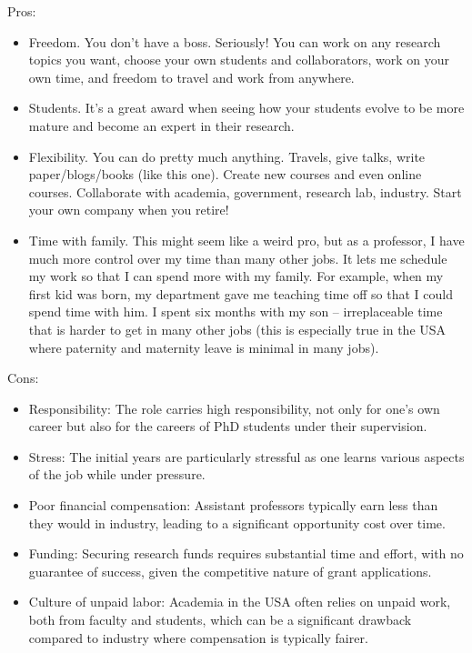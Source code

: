\documentclass[oneside,11pt,dvipsnames]{book}
\begin{document}
Pros:
\begin{itemize}
\item Freedom. You don’t have a boss. Seriously! You can work on any research topics you want, choose your own students and collaborators, work on your own time, and freedom to travel and work from anywhere.

  \item Students. It's a great award when seeing how your students evolve to be more mature and become an expert in their research.

\item Flexibility. You can do pretty much anything.  Travels, give talks, write paper/blogs/books (like this one).  Create new courses and even online courses.  Collaborate  with academia, government, research lab, industry.  Start your own company when you retire!

\item Time with family. This might seem like a weird pro, but as a professor, I have much more
control over my time than many other jobs. It lets me schedule my work so that I can
spend more with my family. For example, when my ﬁrst kid was born, my department
gave me teaching time off so that I could spend time with him. I spent six months with
my son – irreplaceable time that is harder to get in many other jobs (this is especially
true in the USA where paternity and maternity leave is minimal in many jobs).
\end{itemize}

Cons:
\begin{itemize}
\item Responsibility: The role carries high responsibility, not only for one's own career but also for the careers of PhD students under their supervision.
\item Stress: The initial years are particularly stressful as one learns various aspects of the job while under pressure.
\item Poor financial compensation: Assistant professors typically earn less than they would in industry, leading to a significant opportunity cost over time.
\item Funding: Securing research funds requires substantial time and effort, with no guarantee of success, given the competitive nature of grant applications.
\item Culture of unpaid labor: Academia in the USA often relies on unpaid work, both from faculty and students, which can be a significant drawback compared to industry where compensation is typically fairer.
\end{itemize}
\end{document}
